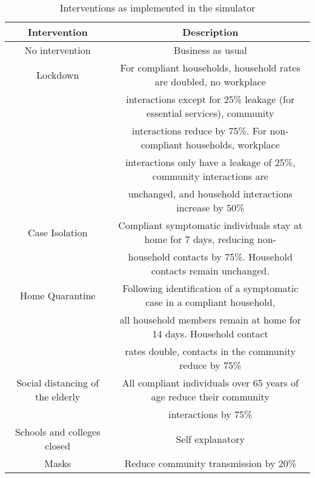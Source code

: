 \documentclass{article}
\theoremstyle{definition}
\begin{document}
     

\begin{table}
  \centering
    \small
    \caption{Interventions as implemented in the simulator \label{interventions}}
    \begin{tabular}{|c|c|}
      \hline
      {\bf Intervention} & {\bf Description}\\
      \hline
      No intervention & Business as usual\\
      Lockdown & For compliant households, household rates are doubled, no workplace \\ & interactions except for 25\% leakage (for essential services), community \\ & interactions reduce by 75\%.  For non-compliant households, workplace \\ & interactions only have a leakage of 25\%,  community interactions are \\ & unchanged, and household interactions increase by 50\%\\
	  Case Isolation & Compliant symptomatic individuals stay at home for 7 days, reducing  non- \\ & household contacts by 75\%. Household contacts remain unchanged.\\
	  Home Quarantine & Following identification of a symptomatic case in a compliant household, \\ & all household members remain at home for 14 days. Household  contact \\ & rates double,  contacts in the community reduce by 75\%\\
	  Social distancing of the elderly & All compliant individuals over 65 years of age reduce their community \\ & interactions by 75\%\\
	  Schools and colleges closed & Self explanatory\\
	  Masks & Reduce community transmission by 20\%\\
      \hline
    \end{tabular}
\end{table}











\end{document}
